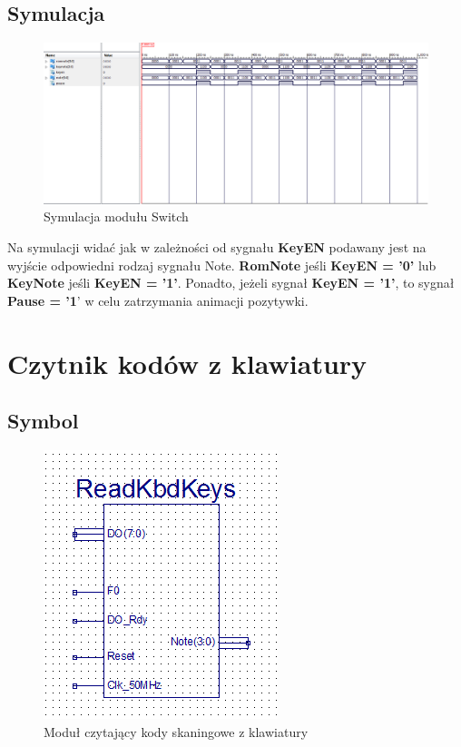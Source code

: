 \documentclass[a4paper]{report}
\begin{document}
		\begin{landscape}
			\subsection{Symulacja}
				\begin{figure}[h!]
					\centering
					\includegraphics[width=1.6\textwidth]{switch_symulacja2.png}
					\caption{Symulacja modułu Switch}
				\end{figure}
			\justify
            Na symulacji widać jak w zależności od sygnału \textbf{KeyEN} podawany jest na wyjście odpowiedni rodzaj sygnału Note. 
            \textbf{RomNote} jeśli \textbf{KeyEN = '0'} lub \textbf{KeyNote} jeśli \textbf{KeyEN = '1'}.
            Ponadto, jeżeli sygnał \textbf{KeyEN = '1'}, to sygnał \textbf{Pause = '1}' w celu zatrzymania animacji pozytywki.
		\end{landscape}
		
	\section{Czytnik kodów z klawiatury}
		\subsection{Symbol}
			\begin{figure}[h!]
				\centering				
				\includegraphics{readkbdkeys2.png}
				\caption{Moduł czytający kody skaningowe z klawiatury}
			\end{figure}
\end{document}
